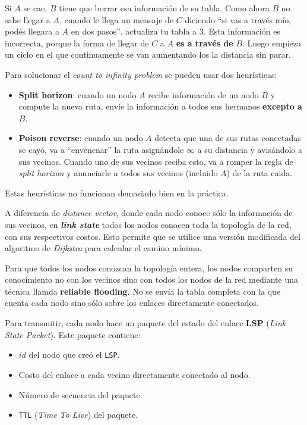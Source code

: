 \documentclass[]{article}
\begin{document}

Si $A$ se cae, $B$ tiene que borrar esa información de su tabla. Como ahora $B$ no sabe llegar a $A$, cuando le llega un mensaje de $C$ diciendo ``si vas a través mío, podés llegara a $A$ en dos pasos'', actualiza tu tabla a 3. Esta información es incorrecta, porque la forma de llegar de $C$ a $A$ \textbf{es a través de} $B$. Luego empieza un ciclo en el que continuamente se van aumentando los la distancia sin parar.

Para solucionar el \emph{count to infinity problem} se pueden usar dos heurísticas:
\begin{itemize}
     \item \textbf{Split horizon}: cuando un nodo $A$ recibe información de un nodo $B$ y compute la nueva ruta, envíe la información a todos sus hermanos \textbf{excepto a $B$}.
     \item \textbf{Poison reverse}: cuando un nodo $A$ detecta que una de sus rutas conectadas se cayó, va a ``envenenar'' la ruta asignándole $\infty$ a su distancia y avisándolo a sus vecinos. Cuando uno de sus vecinos reciba esto, va a romper la regla de \emph{split horizon} y anunciarle a todos sus vecinos (incluido $A$) de la ruta caida.
 \end{itemize}

 Estas heurísticas no funcionan demasiado bien en la práctica.

A diferencia de \emph{distance vector}, donde cada nodo conoce sólo la información de sus vecinos, en \textbf{\emph{link state}} todos los nodos conocen toda la topología de la red, con sus respectivos costos. Esto permite que se utilice una versión modificada del algoritmo de \emph{Dijkstra} para calcular el camino mínimo.

Para que todos los nodos conozcan la topología entera, los nodos comparten su conocimiento no con los vecinos sino con todos los nodos de la red mediante una técnica llamda \textbf{reliable flooding}. No se envía la tabla completa con la que cuenta cada nodo sino sólo sobre los enlaces directamente conectados.

Para transmitir, cada nodo hace un paquete del estado del enlace \textbf{LSP} (\emph{Link State Packet}). Este paquete contiene:
\begin{itemize}
    \item $id$ del nodo que creó el \texttt{LSP}.
    \item Costo del enlace a cada vecino directamente conectado al nodo.
    \item Número de secuencia del paquete.
    \item \texttt{TTL} (\emph{Time To Live}) del paquete.
\end{itemize}
\end{document}
